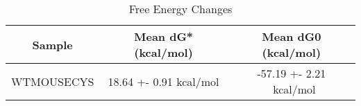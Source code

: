 \documentclass{article}
\begin{document}
\begin{table}[ht]
    \centering
    \begin{tabular}{|c|c|c|}
    \hline
    Sample & Mean dG* (kcal/mol) & Mean dG0 (kcal/mol) \\
    \hline
    WTMOUSECYS & 18.64 +- 0.91 kcal/mol & -57.19 +- 2.21  \ kcal/mol \\
    \hline
    \end{tabular}
    \caption{Free Energy Changes}
\end{table}
\end{document}
